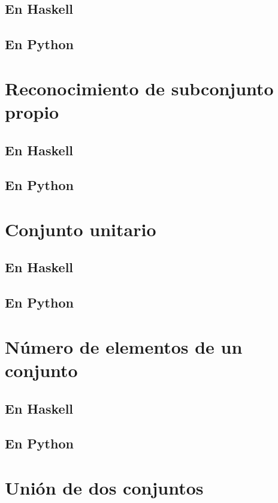 \documentclass[a4paper,12pt,twoside]{book}
\begin{document}
\subsection{En Haskell}
\subsection{En Python}

\section{Reconocimiento de subconjunto propio}
\subsection{En Haskell}
\subsection{En Python}

\section{Conjunto unitario}
\subsection{En Haskell}
\subsection{En Python}

\section{Número de elementos de un conjunto}
\subsection{En Haskell}
\subsection{En Python}

\section{Unión de dos conjuntos}
\end{document}
